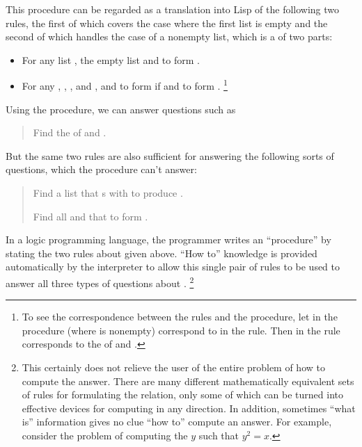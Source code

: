 This procedure can be regarded as a translation into Lisp of the following two rules, the first of which covers the case where the first list is empty and the second of which handles the case of a nonempty list, which is a  of two parts:
\begin{itemize}

	\item
		For any list , the empty list and   to form .

	\item
		For any , , , and ,  and   to form  if  and   to form .%
		\footnote{
			To see the correspondence between the rules and the procedure, let  in the procedure (where  is nonempty) correspond to  in the rule.
			Then  in the rule corresponds to the  of  and .
		}

\end{itemize}
Using the  procedure, we can answer questions such as
\begin{quote}
	Find the  of  and .
\end{quote}
But the same two rules are also sufficient for answering the following sorts of questions, which the procedure can’t answer:
\begin{quote}
	Find a list  that s with  to produce .

	Find all  and  that  to form .
\end{quote}

In a logic programming language, the programmer writes an  “procedure” by stating the two rules about  given above.
“How to” knowledge is provided automatically by the interpreter to allow this single pair of rules to be used to answer all three types of questions about .%
\footnote{
	This certainly does not relieve the user of the entire problem of how to compute the answer.
	There are many different mathematically equivalent sets of rules for formulating the  relation, only some of which can be turned into effective devices for computing in any direction.
	In addition, sometimes “what is” information gives no clue “how to” compute an answer.
	For example, consider the problem of computing the \( y \) such that \( y^2 = x \).
}


